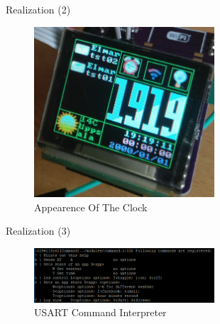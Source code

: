 \documentclass[apectratio=169]{beamer}
\begin{document}
	\begin{frame}{Realization (2)}
	\begin{figure}
        	\centering
                \includegraphics[width=0.6\textwidth]{./fig/clock_weather}
                \caption{Appearence Of The Clock}
        \end{figure}
	\end{frame}
	
	\begin{frame}{Realization (3)}
	\begin{figure}
        	\centering
                \includegraphics[width=0.6\textwidth]{./fig/command_usage}
                \caption{USART Command Interpreter}
        \end{figure}
	\end{frame}
\end{document}
